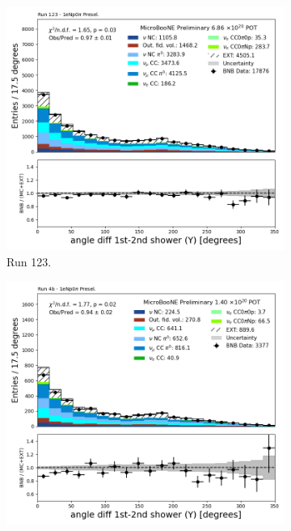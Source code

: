 \begin{figure}[H]
    \centering
    \begin{subfigure}[t]{0.32\linewidth}
        \includegraphics[width=\linewidth]{technote/Appendix_Preselection/Figures/1eNp0pi/Run123/anglediff_Y_Run123_1eNp0pi_Presel.png}
        \caption{Run 123.}
    \end{subfigure}%
    \hspace{0.2cm}%
    \begin{subfigure}[t]{0.32\linewidth}
        \includegraphics[width=\linewidth]{technote/Appendix_Preselection/Figures/1eNp0pi/Run4b/anglediff_Y_Run4b_1eNp0pi_Presel.png}

\end{subfigure}
\end{figure}
